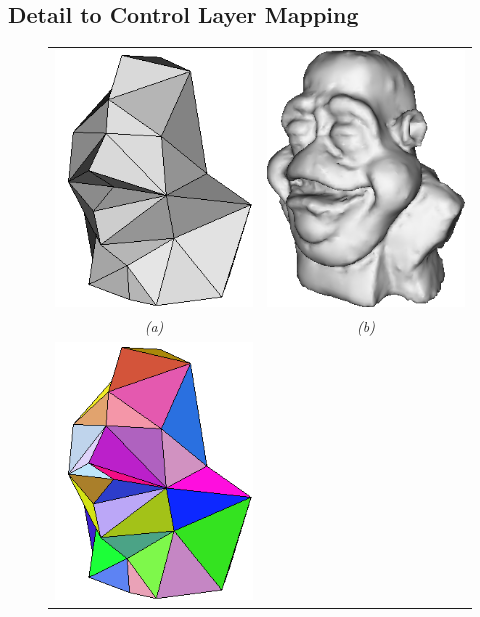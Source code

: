 \subsection{\label{sec:scandata:creation:mapping}Detail to Control Layer Mapping}

\begin{figure}
\begin{center}
\begin{tabular}{cc}
\includegraphics[width=6cm]{../images/dinohead_control} &
\includegraphics[width=6cm]{../images/dinohead_detail} \\
{\it (a)} & {\it (b)} \\
\includegraphics[width=6cm]{../images/dinohead_control_colour} &

\end{tabular}
\end{center}
\end{figure}
